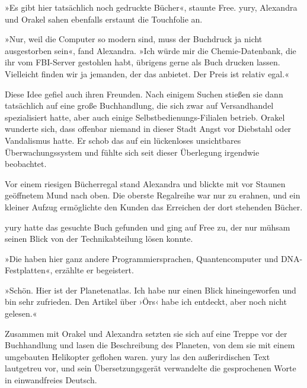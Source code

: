 »Es gibt hier tatsächlich noch gedruckte Bücher«, staunte Free. yury, Alexandra und Orakel sahen ebenfalls erstaunt die Touchfolie an.

»Nur, weil die Computer so modern sind, muss der Buchdruck ja nicht ausgestorben sein«, fand Alexandra. »Ich würde mir die Chemie-Datenbank, die ihr vom FBI-Server gestohlen habt, übrigens gerne als Buch drucken lassen. Vielleicht finden wir ja jemanden, der das anbietet. Der Preis ist relativ egal.«

Diese Idee gefiel auch ihren Freunden. Nach einigem Suchen stießen sie dann tatsächlich auf eine große Buchhandlung, die sich zwar auf Versandhandel spezialisiert hatte, aber auch einige Selbstbedienungs-Filialen betrieb. Orakel wunderte sich, dass offenbar niemand in dieser Stadt Angst vor Diebstahl oder Vandalismus hatte. Er schob das auf ein lückenloses unsichtbares Überwachungssystem und fühlte sich seit dieser Überlegung irgendwie beobachtet.

Vor einem riesigen Bücherregal stand Alexandra und blickte mit vor Staunen geöffnetem Mund nach oben. Die oberste Regalreihe war nur zu erahnen, und ein kleiner Aufzug ermöglichte den Kunden das Erreichen der dort stehenden Bücher.

yury hatte das gesuchte Buch gefunden und ging auf Free zu, der nur mühsam seinen Blick von der Technikabteilung lösen konnte.

»Die haben hier ganz andere Programmiersprachen, Quantencomputer und DNA-Festplatten«, erzählte er begeistert.

»Schön. Hier ist der Planetenatlas. Ich habe nur einen Blick hineingeworfen und bin sehr zufrieden. Den Artikel über ›Örs‹ habe ich entdeckt, aber noch nicht gelesen.«

Zusammen mit Orakel und Alexandra setzten sie sich auf eine Treppe vor der Buchhandlung und lasen die Beschreibung des Planeten, von dem sie mit einem umgebauten Helikopter geflohen waren. yury las den außerirdischen Text lautgetreu vor, und sein Übersetzungsgerät verwandelte die gesprochenen Worte in einwandfreies Deutsch.


